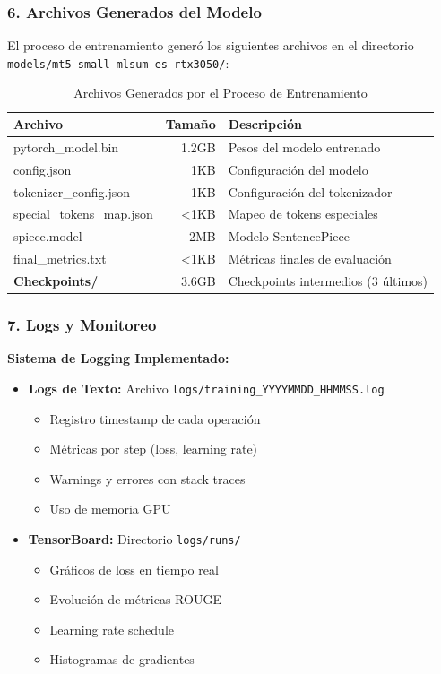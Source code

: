 \documentclass[12pt,a4paper]{article}
\begin{document}
\newpage

\subsubsection{6. Archivos Generados del Modelo}

El proceso de entrenamiento generó los siguientes archivos en el directorio \texttt{models/mt5-small-mlsum-es-rtx3050/}:

\begin{table}[H]
\centering
\begin{tabular}{lrp{6cm}}
\toprule
\textbf{Archivo} & \textbf{Tamaño} & \textbf{Descripción} \\
\midrule
pytorch\_model.bin & ~1.2GB & Pesos del modelo entrenado \\
config.json & ~1KB & Configuración del modelo \\
tokenizer\_config.json & ~1KB & Configuración del tokenizador \\
special\_tokens\_map.json & <1KB & Mapeo de tokens especiales \\
spiece.model & ~2MB & Modelo SentencePiece \\
final\_metrics.txt & <1KB & Métricas finales de evaluación \\
\midrule
\textbf{Checkpoints/} & ~3.6GB & Checkpoints intermedios (3 últimos) \\
\bottomrule
\end{tabular}
\caption{Archivos Generados por el Proceso de Entrenamiento}
\label{tab:archivos_modelo}
\end{table}

\subsubsection{7. Logs y Monitoreo}

\textbf{Sistema de Logging Implementado:}

\begin{itemize}
    \item \textbf{Logs de Texto:} Archivo \texttt{logs/training\_YYYYMMDD\_HHMMSS.log}
    \begin{itemize}
        \item Registro timestamp de cada operación
        \item Métricas por step (loss, learning rate)
        \item Warnings y errores con stack traces
        \item Uso de memoria GPU
    \end{itemize}
    
    \item \textbf{TensorBoard:} Directorio \texttt{logs/runs/}
    \begin{itemize}
        \item Gráficos de loss en tiempo real
        \item Evolución de métricas ROUGE
        \item Learning rate schedule
        \item Histogramas de gradientes
    \end{itemize}
\end{itemize}
\end{document}
